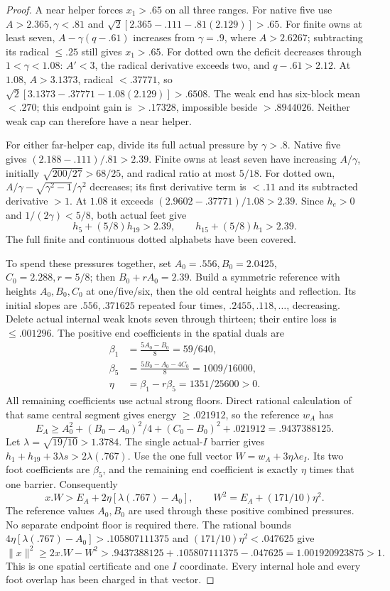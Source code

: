 \documentclass[11pt]{article}
\theoremstyle{definition}
\theoremstyle{remark}
\newcommand{\norm}[1]{\lVert #1\rVert}
\begin{document}
\begin{proof}
A near helper forces $x_1>.65$ on all three ranges.
For native five use $A>2.365,\gamma<.81$ and
$\sqrt2[2.365-.111-.81(2.129)]>.65$.
For finite owns at least seven, $A-\gamma(q-.61)$ increases
from $\gamma=.9$, where $A>2.6267$; subtracting its radical
$\le.25$ still gives $x_1>.65$.
For dotted own the deficit decreases through $1<\gamma<1.08$:
$A'<3$, the radical derivative exceeds two, and $q-.61>2.12$.
At $1.08$, $A>3.1373$, radical $<.37771$, so
$\sqrt2[3.1373-.37771-1.08(2.129)]>.6508$.
The weak end has six-block mean $<.270$; this endpoint gain is
$>.17328$, impossible beside $>.8944026$. Neither weak cap
can therefore have a near helper.

For either far-helper cap, divide its full actual pressure by
$\gamma>.8$. Native five gives $(2.188-.111)/.81>2.39$.
Finite owns at least seven have increasing $A/\gamma$, initially
$\sqrt{200/27}>68/25$, and radical ratio at most $5/18$.
For dotted own, $A/\gamma-\sqrt{\gamma^2-1}/\gamma^2$ decreases;
its first derivative term is $<.11$ and its subtracted derivative
$>1$. At $1.08$ it exceeds $(2.9602-.37771)/1.08>2.39$.
Since $h_e>0$ and $1/(2\gamma)<5/8$, both actual feet give
\[
 h_5+(5/8)h_{19}>2.39,\qquad
 h_{15}+(5/8)h_1>2.39.
\]
The full finite and continuous dotted alphabets have been covered.

To spend these pressures together, set $A_0=.556,B_0=2.0425$,
$C_0=2.288,r=5/8$; then $B_0+rA_0=2.39$.
Build a symmetric reference with heights $A_0,B_0,C_0$ at
one/five/six, then the old central heights and reflection.
Its initial slopes are $.556,.371625$ repeated four times,
$.2455,.118,\ldots$, decreasing. Delete actual internal weak
knots seven through thirteen; their entire loss is $\le.001296$.
The positive end coefficients in the spatial duals are
\[
\begin{aligned}
 \beta_1&={\frac{5A_0-B_0}{8}}=59/640,\\
 \beta_5&={\frac{5B_0-A_0-4C_0}{8}}=1009/16000,\\
 \eta&=\beta_1-r\beta_5=1351/25600>0.
\end{aligned}
\]
All remaining coefficients use actual strong floors. Direct rational
calculation of that same central segment gives energy $\ge.021912$,
so the reference $w_A$ has
\[
 E_A\ge A_0^2+(B_0-A_0)^2/4+(C_0-B_0)^2+.021912
       =.9437388125.
\]
Let $\lambda=\sqrt{19/10}>1.3784$.
The single actual-$I$ barrier gives
$h_1+h_{19}+3\lambda s>2\lambda(.767)$.
Use the one full vector $W=w_A+3\eta\lambda e_I$.
Its two foot coefficients are $\beta_5$, and the remaining end
coefficient is exactly $\eta$ times that one barrier. Consequently
\[
 x.W>E_A+2\eta[\lambda(.767)-A_0],\qquad
 W^2=E_A+(171/10)\eta^2.
\]
The reference values $A_0,B_0$ are used through these positive
combined pressures. No separate endpoint floor is required there.
The rational bounds
$4\eta[\lambda(.767)-A_0]>.105807111375$ and
$(171/10)\eta^2<.047625$ give
\[
 \norm x^2\ge2x.W-W^2>
 .9437388125+.105807111375-.047625
 =1.001920923875>1.
\]
This is one spatial certificate and one $I$ coordinate. Every
internal hole and every foot overlap has been charged in that vector.
\end{proof}
\end{document}

